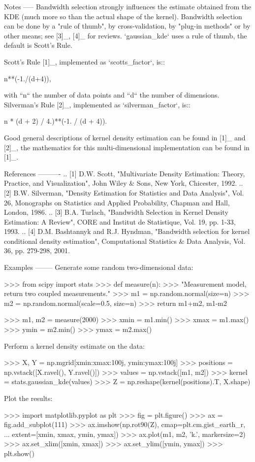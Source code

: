 \begin{DoxyVerb}
Notes
-----
Bandwidth selection strongly influences the estimate obtained from the KDE
(much more so than the actual shape of the kernel).  Bandwidth selection
can be done by a "rule of thumb", by cross-validation, by "plug-in
methods" or by other means; see [3]_, [4]_ for reviews.  `gaussian_kde`
uses a rule of thumb, the default is Scott's Rule.

Scott's Rule [1]_, implemented as `scotts_factor`, is::

    n**(-1./(d+4)),

with ``n`` the number of data points and ``d`` the number of dimensions.
Silverman's Rule [2]_, implemented as `silverman_factor`, is::

    n * (d + 2) / 4.)**(-1. / (d + 4)).

Good general descriptions of kernel density estimation can be found in [1]_
and [2]_, the mathematics for this multi-dimensional implementation can be
found in [1]_.

References
----------
.. [1] D.W. Scott, "Multivariate Density Estimation: Theory, Practice, and
       Visualization", John Wiley & Sons, New York, Chicester, 1992.
.. [2] B.W. Silverman, "Density Estimation for Statistics and Data
       Analysis", Vol. 26, Monographs on Statistics and Applied Probability,
       Chapman and Hall, London, 1986.
.. [3] B.A. Turlach, "Bandwidth Selection in Kernel Density Estimation: A
       Review", CORE and Institut de Statistique, Vol. 19, pp. 1-33, 1993.
.. [4] D.M. Bashtannyk and R.J. Hyndman, "Bandwidth selection for kernel
       conditional density estimation", Computational Statistics & Data
       Analysis, Vol. 36, pp. 279-298, 2001.

Examples
--------
Generate some random two-dimensional data:

>>> from scipy import stats
>>> def measure(n):
>>>     "Measurement model, return two coupled measurements."
>>>     m1 = np.random.normal(size=n)
>>>     m2 = np.random.normal(scale=0.5, size=n)
>>>     return m1+m2, m1-m2

>>> m1, m2 = measure(2000)
>>> xmin = m1.min()
>>> xmax = m1.max()
>>> ymin = m2.min()
>>> ymax = m2.max()

Perform a kernel density estimate on the data:

>>> X, Y = np.mgrid[xmin:xmax:100j, ymin:ymax:100j]
>>> positions = np.vstack([X.ravel(), Y.ravel()])
>>> values = np.vstack([m1, m2])
>>> kernel = stats.gaussian_kde(values)
>>> Z = np.reshape(kernel(positions).T, X.shape)

Plot the results:

>>> import matplotlib.pyplot as plt
>>> fig = plt.figure()
>>> ax = fig.add_subplot(111)
>>> ax.imshow(np.rot90(Z), cmap=plt.cm.gist_earth_r,
...           extent=[xmin, xmax, ymin, ymax])
>>> ax.plot(m1, m2, 'k.', markersize=2)
>>> ax.set_xlim([xmin, xmax])
>>> ax.set_ylim([ymin, ymax])
>>> plt.show()\end{DoxyVerb}
 

